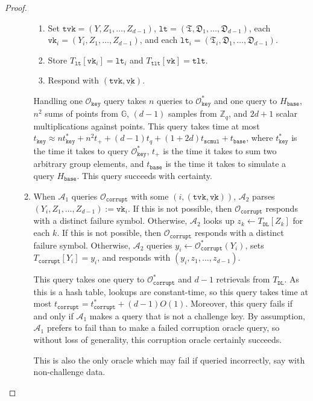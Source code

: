 \documentclass[11pt]{article}
\theoremstyle{definition}
\newcommand{\G}{\mathbb{G}}
\newcommand{\vk}{\texttt{vk}}
\newcommand{\lt}{\texttt{lt}}
\newcommand{\tlt}{\texttt{tlt}}
\newcommand{\tvk}{\texttt{tvk}}
\newcommand{\VK}{\underline{\texttt{vk}}}
\newcommand{\Zq}{\mathbb{Z}_q}
\newcommand{\corruptionOracle}{\mathcal{O}_{\texttt{corrupt}}}
\newcommand{\keyOracle}{\mathcal{O}_{\texttt{key}}}
\begin{document}
\begin{proof}
\begin{enumerate}
\begin{enumerate}
\begin{enumerate}
\item Set $\tvk = (Y, Z_1, \ldots, Z_{d-1})$, $\lt = (\mathfrak{T}, \mathfrak{D}_1, \ldots, \mathfrak{D}_{d-1})$, each $\vk_i = (Y_i, Z_1, \ldots, Z_{d-1})$, and each $\lt_i = (\mathfrak{T}_i, \mathfrak{D}_1, \ldots, \mathfrak{D}_{d-1})$. 
\item Store $T_{\lt}[\vk_i] = \lt_i$ and $T_{\tlt}[\vk] = \tlt$. 
\item Respond with $(\tvk, \VK)$. 
\end{enumerate}
Handling one $\keyOracle$ query takes $n$ queries to $\keyOracle^*$ and one query to $H_{\texttt{base}}$, $n^2$ sums of points from $\G$, $(d-1)$ samples from $\Zq$, and $2d+1$ scalar multiplications against points. This query takes time at most $t_{\texttt{key}} \approx nt_{\texttt{key}}^* + n^2 t_+ + (d-1)t_{q} + (1+2d)t_{\texttt{scmul}} + t_{\texttt{base}}$, where $t_{\texttt{key}}^*$ is the time it takes to query $\keyOracle^*$, $t_+$ is the time it takes to sum two arbitrary group elements, and $t_{\texttt{base}}$ is the time it takes to simulate a query $H_{\texttt{base}}$. This query succeeds with certainty.

\item When $\mathcal{A}_1$ queries $\corruptionOracle$ with some $(i, (\tvk, \VK))$, $\mathcal{A}_2$ parses $(Y_i, Z_1, \ldots, Z_{d-1}) := \vk_i$. If this is not possible, then $\corruptionOracle$ responds with a distinct failure symbol. 
Otherwise, $\mathcal{A}_2$ looks up $z_k \leftarrow T_{\texttt{DL}}[Z_k]$ for each $k$. If this is not possible, then $\corruptionOracle$ responds with a distinct failure symbol. Otherwise, $\mathcal{A}_2$ queries $y_i \leftarrow \corruptionOracle^*(Y_i)$, sets $T_{\texttt{corrupt}}[Y_i] = y_i$, and responds with $(y_i, z_1, \ldots, z_{d-1})$.

This query takes one query to $\corruptionOracle^*$ and $d-1$ retrievals from $T_{\texttt{DL}}$. As this is a hash table, lookups are constant-time, so this query takes time at most $t_{\texttt{corrupt}} = t_{\texttt{corrupt}}^* + (d-1)O(1)$.  Moreover, this query fails if and only if $\mathcal{A}_1$ makes a query that is not a challenge key. By assumption, $\mathcal{A}_1$ prefers to fail than to make a failed corruption oracle query, so without loss of generality, this corruption oracle certainly succeeds.

This is also the only oracle which may fail if queried incorrectly, say with non-challenge data.


\end{enumerate}
\end{enumerate}
\end{proof}
\end{document}

